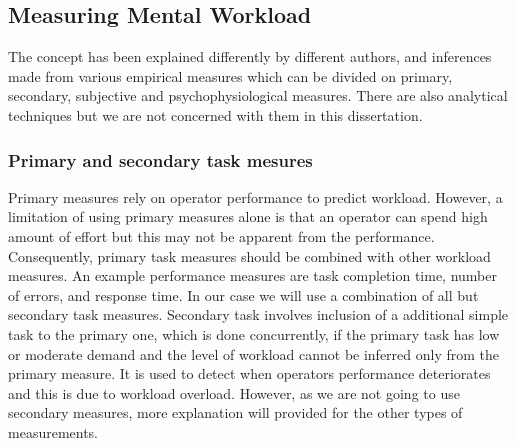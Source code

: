 \documentclass[a4paper]{report}
\begin{document}
		
			\subsection{Measuring Mental Workload}
			The concept has been explained differently by different authors, and inferences made from various empirical measures which can be divided on primary, secondary, subjective and psychophysiological measures. There are also analytical techniques but we are not concerned with them in this dissertation.
				\subsubsection{Primary and secondary task mesures}
				Primary measures rely on operator performance to predict workload. However, a limitation of using primary measures alone is that an operator can spend high amount of effort but this may not be apparent from the performance\cite{wilson2015evaluation}. Consequently, primary task measures should be combined with other workload measures. An example performance measures are task completion time, number of errors, and response time. In our case we will use a combination of all but secondary task measures. Secondary task involves inclusion of a additional simple task to the primary one, which is done concurrently, if the primary task has low or moderate demand and the level of workload cannot be inferred only from the primary measure. It is used to detect when operators performance deteriorates and this is due to workload overload. However, as we are not going to use secondary measures, more explanation will provided for the other types of measurements.
\end{document}
